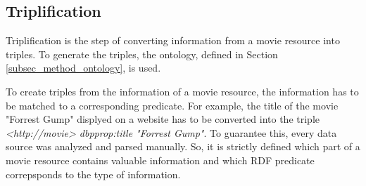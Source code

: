 \subsection{Triplification}
\label{subsec_method_triplification}

Triplification is the step of converting information from a movie resource into triples.
To generate the triples, the ontology, defined in Section \ref{subsec_method_ontology}, is used.

To create triples from the information of a movie resource, the information has to be matched to a corresponding predicate.
For example, the title of the movie "Forrest Gump" displyed on a website has to be converted into the triple \emph{<http://movie> dbpprop:title "Forrest Gump"}.
To guarantee this, every data source was analyzed and parsed manually.
So, it is strictly defined which part of a movie resource contains valuable information and which RDF predicate correpsponds to the type of information.